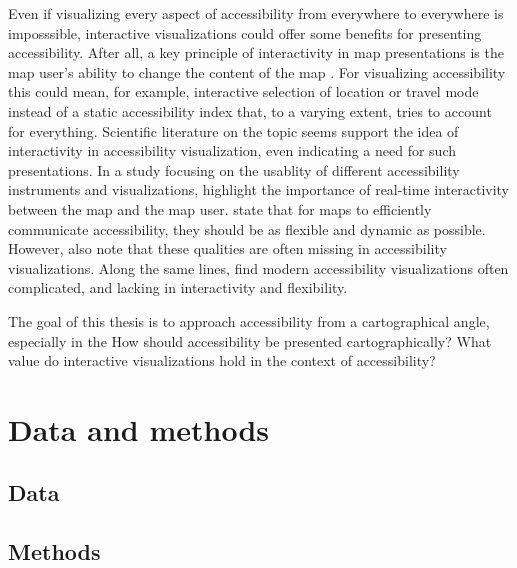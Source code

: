 \documentclass{article}
\begin{document}
Even if visualizing every aspect of accessibility from everywhere to everywhere is imposssible,
interactive visualizations could offer some benefits for presenting accessibility.
After all, a key principle of interactivity in map presentations is
the map user's ability to change the content of the map \parencite{rot2013}.
For visualizing accessibility this could mean, for example,
interactive selection of location or travel mode instead of
a static accessibility index that, to a varying extent, tries to account for everything.
Scientific literature on the topic seems support the idea of
interactivity in accessibility visualization, even indicating a need for such presentations.
In a study focusing on the usablity of different accessibility instruments and visualizations,  %
\textcite{te2014} highlight the importance of real-time interactivity between the map and the map user.
\textcite{but2018} state that for maps to efficiently communicate accessibility,
they should be as flexible and dynamic as possible.
However, \citeauthor{but2018} also note that these qualities are often missing in accessibility visualizations.
Along the same lines, \textcite{paj2021} find modern accessibility visualizations often complicated,
and lacking in interactivity and flexibility.


The goal of this thesis is to approach accessibility from a cartographical angle,
especially in the  %
How should accessibility be presented cartographically?
What value do interactive visualizations hold in the context of accessibility?



\section{Data and methods}

\subsection{Data}

\subsection{Methods}

\printbibliography
\end{document}
